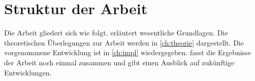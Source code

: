 \section{Struktur der Arbeit}\label{sec:struktur}

Die Arbeit gliedert sich wie folgt.  erläutert wesentliche Grundlagen. Die theoretischen
Überlegungen zur Arbeit werden in \cref{ch:theorie} dargestellt. Die vorgenommene Entwicklung ist in \cref{ch:impl}
wiedergegeben.   fasst die Ergebnisse der Arbeit noch einmal zusammen und gibt einen Ausblick auf
zukünftige Entwicklungen.



